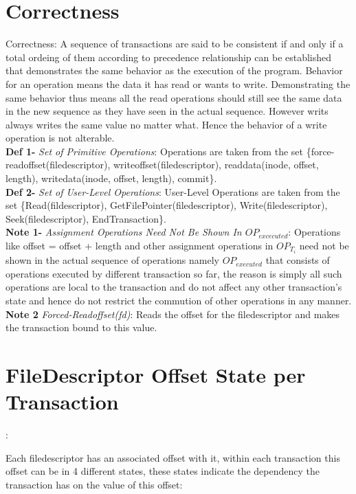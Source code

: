 \documentclass[a4paper, 11pt]{article}
\begin{document}
\section{Correctness}

{Correctness}: A sequence of transactions are said to be consistent if and only if a total ordeing of them according to precedence relationship can be established that demonstrates the same behavior as the execution of the program. Behavior for an operation means the data it has read or wants to write. Demonstrating the same behavior thus means all the read operations should still see the same data in the new sequence as they have seen in the actual sequence. However writs always writes the same value no matter what. Hence the behavior of a write operation is not alterable.\\

\textbf{Def 1-} \emph{Set of Primitive Operations}: Operations are taken from the set \{force-readoffset(filedescriptor), writeoffset(filedescriptor), readdata(inode, offset, length), writedata(inode, offset, length), commit\}.\\

\textbf{Def 2-} \emph{Set of User-Level Operations}: User-Level Operations are taken from the set \{Read(fildescriptor), GetFilePointer(filedescriptor), Write(filedescriptor), Seek(filedescriptor), EndTransaction\}.\\

\textbf{Note 1-} \emph{Assignment Operations Need Not Be Shown In $OP_{excecuted}$}: Operations like offset = offset + length and other assignment operations in $OP_{T_i}$ need not be shown in the actual sequence of operations namely $OP_{executed}$ that consists of operations executed by different transaction so far, the reason is simply all such operations are local to the transaction and do not affect any other transaction's state and hence do not restrict the commution of other operations in any manner.\\

\textbf{Note 2} \emph{Forced-Readoffset(fd)}: Reads the offset for the filedescriptor and makes the transaction bound to this value.\\

\section{FileDescriptor Offset State per Transaction}:

Each filedescriptor has an associated offset with it, within each transaction this offset can be in 4 different states, these states indicate the dependency the transaction has on the value of this offset:\\
\end{document}
